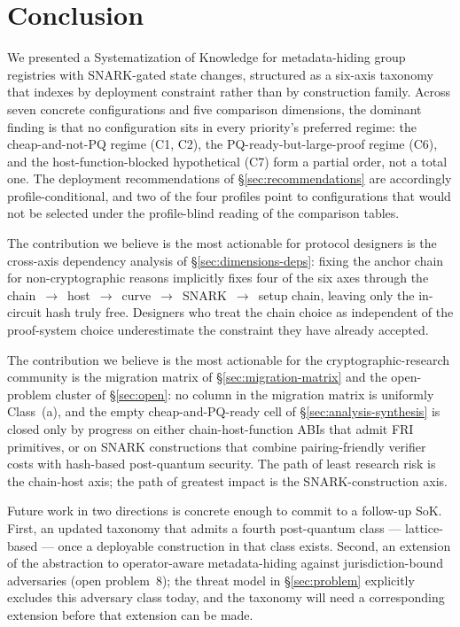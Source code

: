 \section{Conclusion}
\label{sec:conclusion}

We presented a Systematization of Knowledge for metadata-hiding group
registries with SNARK-gated state changes, structured as a six-axis
taxonomy that indexes by deployment constraint rather than by
construction family. Across seven concrete configurations and five
comparison dimensions, the dominant finding is that no configuration
sits in every priority's preferred regime: the cheap-and-not-PQ
regime (C1, C2), the PQ-ready-but-large-proof regime (C6), and the
host-function-blocked hypothetical (C7) form a partial order, not a
total one. The deployment recommendations of
\S\ref{sec:recommendations} are accordingly profile-conditional, and
two of the four profiles point to configurations that would not be
selected under the profile-blind reading of the comparison tables.

The contribution we believe is the most actionable for protocol
designers is the cross-axis dependency analysis of
\S\ref{sec:dimensions-deps}: fixing the anchor chain for
non-cryptographic reasons implicitly fixes four of the six axes
through the chain~$\to$~host~$\to$~curve~$\to$~SNARK~$\to$~setup
chain, leaving only the in-circuit hash truly free. Designers who
treat the chain choice as independent of the proof-system choice
underestimate the constraint they have already accepted.

The contribution we believe is the most actionable for the
cryptographic-research community is the migration matrix of
\S\ref{sec:migration-matrix} and the open-problem cluster of
\S\ref{sec:open}: no column in the migration matrix is uniformly
Class~(a), and the empty cheap-and-PQ-ready cell of
\S\ref{sec:analysis-synthesis} is closed only by progress on either
chain-host-function ABIs that admit FRI primitives, or on
SNARK constructions that combine pairing-friendly verifier costs
with hash-based post-quantum security. The path of least research
risk is the chain-host axis; the path of greatest impact is the
SNARK-construction axis.

Future work in two directions is concrete enough to commit to a
follow-up SoK. First, an updated taxonomy that admits a fourth
post-quantum class --- lattice-based --- once a deployable
construction in that class exists. Second, an extension of the
abstraction to operator-aware metadata-hiding against
jurisdiction-bound adversaries (open problem~8); the threat model in
\S\ref{sec:problem} explicitly excludes this adversary class today,
and the taxonomy will need a corresponding extension before that
extension can be made.
